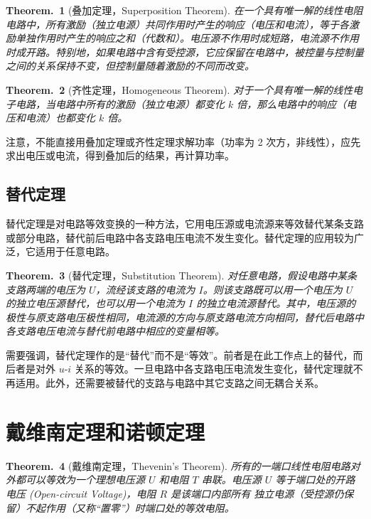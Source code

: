 \documentclass[UTF8]{report}
\theoremstyle{MyLineTheoremStyle} %
\newtheorem{LineTheorem}{Theorem.\,}
\theoremstyle{MyBlockTheoremStyle} %
\theoremstyle{MySubsubsectionStyle} %
\begin{document}
\begin{LineTheorem}[叠加定理，Superposition Theorem]\label{叠加定理}
    在一个具有唯一解的线性电阻电路中，所有激励（独立电源）共同作用时产生的响应（电压和电流），等于各激励单独作用时产生的响应之和（代数和）。电压源不作用时成短路，电流源不作用时成开路。特别地，如果电路中含有受控源，它应保留在电路中，被控量与控制量之间的关系保持不变，但控制量随着激励的不同而改变。
\end{LineTheorem}

\begin{LineTheorem}[齐性定理，Homogeneous Theorem]\label{齐性定理}
对于一个具有唯一解的线性电子电路，当电路中所有的激励（独立电源）都变化 $k$ 倍，那么电路中的响应（电压和电流）也都变化 $k$ 倍。
\end{LineTheorem}

注意，不能直接用叠加定理或齐性定理求解功率（功率为 2 次方，非线性），应先求出电压或电流，得到叠加后的结果，再计算功率。


\subsection{替代定理}

替代定理是对电路等效变换的一种方法，它用电压源或电流源来等效替代某条支路或部分电路，替代前后电路中各支路电压电流不发生变化。替代定理的应用较为广泛，它适用于任意电路。

\begin{LineTheorem}[替代定理，Substitution Theorem]\label{替代定理}
    对任意电路，假设电路中某条支路两端的电压为 $U$，流经该支路的电流为 $I$。则该支路既可以用一个电压为 $U$ 的独立电压源替代，也可以用一个电流为 $I$ 的独立电流源替代。其中，电压源的极性与原支路电压极性相同，电流源的方向与原支路电流方向相同，替代后电路中各支路电压电流与替代前电路中相应的变量相等。
\end{LineTheorem}

需要强调，替代定理作的是“替代”而不是“等效”。前者是在此工作点上的替代，而后者是对外 $u$-$i$ 关系的等效。一旦电路中各支路电压电流发生变化，替代定理就不再适用。此外，还需要被替代的支路与电路中其它支路之间无耦合关系。

\section{戴维南定理和诺顿定理}

\begin{LineTheorem}[戴维南定理，Thevenin's Theorem]\label{戴维南定理}
    所有的一端口线性电阻电路对外都可以等效为一个理想电压源 $U$ 和电阻 $T$ 串联。电压源 $U$ 等于端口处的开路电压 (Open-circuit Voltage)，电阻 $R$ 是该端口内部所有{\color{red} 独立电源}（受控源仍保留）不起作用（又称“置零”）时端口处的等效电阻。
\end{LineTheorem}
\end{document}
